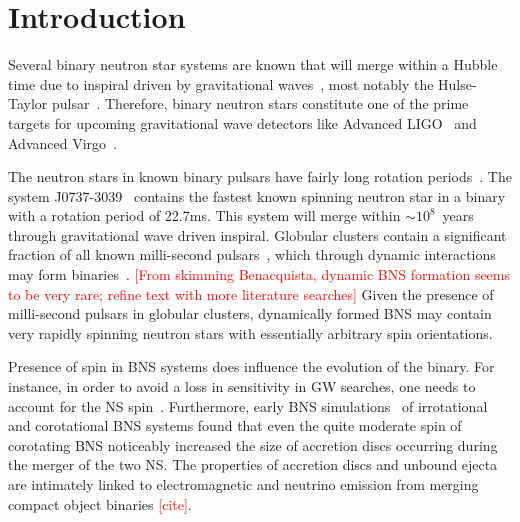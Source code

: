 \documentclass[aps,prd,amsmath,floatfix
,twocolumn
,superscriptaddress,nofootinbib,showpacs]{revtex4-1}
\theoremstyle{plain} \newtheorem{thm}{Theorem} \newtheorem{lem}{Lemma}
\newcommand{\red}[1]{\textcolor{Red}{#1}}
\begin{document}

\section{Introduction}



Several binary neutron star systems are known that will merge within a
Hubble time due to inspiral driven by gravitational
waves~\cite{Lorimer2008}, most notably the Hulse-Taylor
pulsar~\cite{Hulse:1975uf}.  Therefore, binary neutron stars
constitute one of the prime targets for upcoming gravitational wave
detectors like Advanced LIGO~\cite{aLIGO1,aLIGO2} and Advanced
Virgo~\cite{AdV}.


The neutron stars in known
binary pulsars have fairly long rotation periods~\cite{Lorimer2008}.
The system J0737-3039~\cite{Lyne:2004cj} contains the fastest known
spinning neutron star in a binary with a rotation period of 22.7ms.
This system will merge within $\sim 10^8$~years through gravitational
wave driven inspiral.  Globular clusters contain a significant
fraction of all known milli-second pulsars~\cite{Lorimer2008}, which
through dynamic interactions may form
binaries~\cite{Benacquista:2011kv}. \red{[From skimming Benacquista,
  dynamic BNS formation seems to be very rare; refine text with more
  literature searches]} Given the presence of milli-second pulsars in
globular clusters, dynamically formed BNS may contain very rapidly
spinning neutron stars with essentially arbitrary spin orientations.

Presence of spin in BNS systems does influence the evolution of the
binary.  For instance, in order to avoid a loss in sensitivity in GW
searches, one needs to account for the NS spin~\cite{Brown:2012qf}.
Furthermore, early BNS simulations~\cite{Shibata00b} of irrotational
and corotational BNS systems found that even the quite moderate spin
of corotating BNS noticeably increased the size of accretion discs
occurring during the merger of the two NS.  The properties of
accretion discs and unbound ejecta are intimately linked to
electromagnetic and neutrino emission from merging compact object
binaries \red{[cite]}. 
\end{document}
